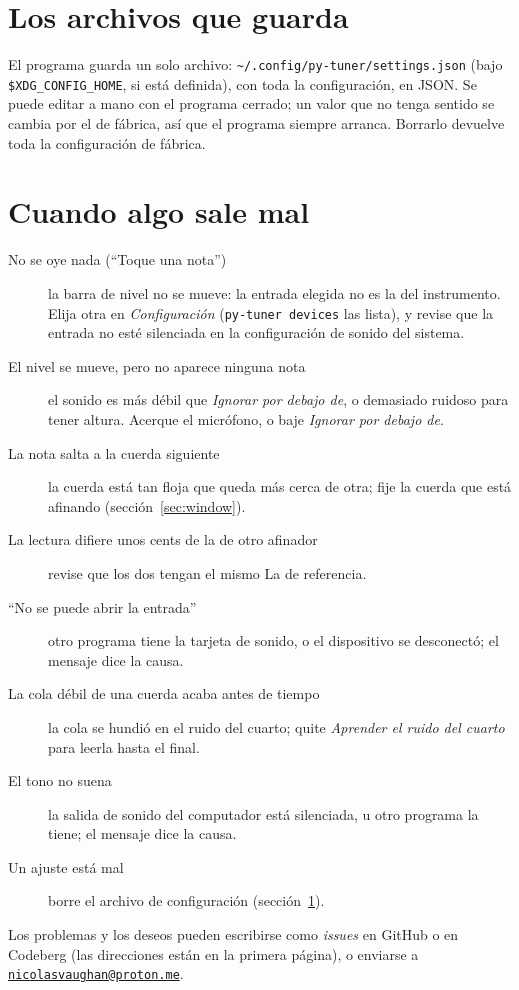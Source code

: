 \documentclass[12pt,
              article,
              oneside
              ]{memoir}
\newcommand*{\menu}[1]{\textit{#1}}
\begin{document}
\section{Los archivos que guarda}
\label{sec:files}

%
El programa guarda un solo archivo:
\texttt{\textasciitilde/.config/py-tuner/settings.json} (bajo
\texttt{\$XDG\_CONFIG\_HOME}, si está definida), con toda la configuración,
en JSON. Se puede editar a mano con el programa cerrado; un valor que no
tenga sentido se cambia por el de fábrica, así que el programa siempre
arranca. Borrarlo devuelve toda la configuración de fábrica.

\section{Cuando algo sale mal}

%
\begin{description}
\item[No se oye nada (``Toque una nota'')] la barra de nivel no se mueve:
  la entrada elegida no es la del instrumento. Elija otra en
  \menu{Configuración} (\texttt{py-tuner devices} las lista), y revise que
  la entrada no esté silenciada en la configuración de sonido del sistema.
\item[El nivel se mueve, pero no aparece ninguna nota] el sonido es más
  débil que \menu{Ignorar por debajo de}, o demasiado ruidoso para tener
  altura. Acerque el micrófono, o baje \menu{Ignorar por debajo de}.
\item[La nota salta a la cuerda siguiente] la cuerda está tan floja que
  queda más cerca de otra; fije la cuerda que está afinando
  (sección~\ref{sec:window}).
\item[La lectura difiere unos cents de la de otro afinador] revise que los
  dos tengan el mismo La de referencia.
\item[``No se puede abrir la entrada''] otro programa tiene la tarjeta de
  sonido, o el dispositivo se desconectó; el mensaje dice la causa.
\item[La cola débil de una cuerda acaba antes de tiempo] la cola se hundió
  en el ruido del cuarto; quite \menu{Aprender el ruido del cuarto} para
  leerla hasta el final.
\item[El tono no suena] la salida de sonido del computador está
  silenciada, u otro programa la tiene; el mensaje dice la causa.
\item[Un ajuste está mal] borre el archivo de configuración
  (sección~\ref{sec:files}).
\end{description}

\noindent
Los problemas y los deseos pueden escribirse como \emph{issues} en GitHub o
en Codeberg (las direcciones están en la primera página), o enviarse a
\href{mailto:nicolasvaughan@proton.me}{\texttt{nicolasvaughan@proton.me}}.

\printindex
\end{document}
